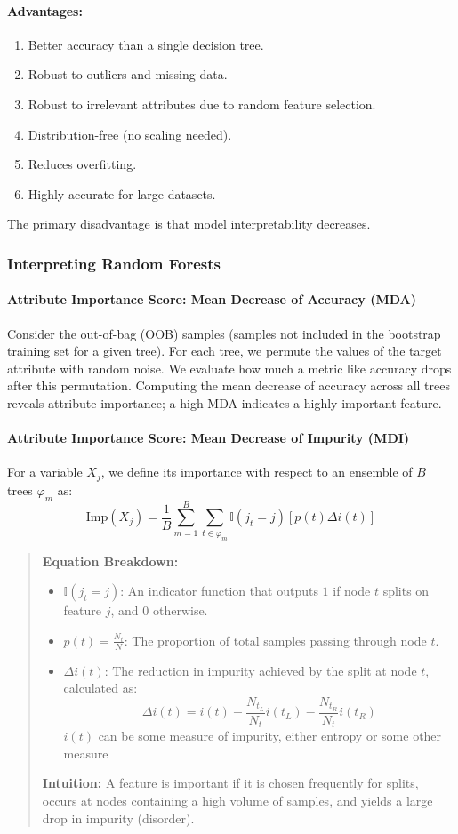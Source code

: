 \documentclass{article}
\begin{document}
\paragraph{Advantages:}
\begin{enumerate}
  \item Better accuracy than a single decision tree.
  \item Robust to outliers and missing data.
  \item Robust to irrelevant attributes due to random feature selection.
  \item Distribution-free (no scaling needed).
  \item Reduces overfitting.
  \item Highly accurate for large datasets.
\end{enumerate}
The primary disadvantage is that model interpretability decreases.

\subsubsection{Interpreting Random Forests}
\paragraph{Attribute Importance Score: Mean Decrease of Accuracy (MDA)}
Consider the out-of-bag (OOB) samples (samples not included in the bootstrap training set for a given tree). For each tree, we permute the values of the target attribute with random noise. We evaluate how much a metric like accuracy drops after this permutation. Computing the mean decrease of accuracy across all trees reveals attribute importance; a high MDA indicates a highly important feature.

\paragraph{Attribute Importance Score: Mean Decrease of Impurity (MDI)}
For a variable $X_j$, we define its importance with respect to an ensemble of $B$ trees $\varphi_m$ as:
\[ \text{Imp}(X_j) = \frac{1}{B}\sum_{m=1}^B \sum_{t\in \varphi_m} \mathbb{I}(j_t = j)\left[p(t)\Delta i (t)\right] \]

\begin{quote}
\textbf{Equation Breakdown:} 
\begin{itemize}
  \item $\mathbb{I}(j_t = j)$: An indicator function that outputs $1$ if node $t$ splits on feature $j$, and $0$ otherwise.
  \item $p(t) = \frac{N_t}{N}$: The proportion of total samples passing through node $t$.
  \item $\Delta i(t)$: The reduction in impurity achieved by the split at node $t$, calculated as:
  \[ \Delta i(t) = i(t) - \frac{N_{t_L}}{N_t} i(t_L) - \frac{N_{t_R}}{N_t}i(t_R) \]
  $i(t)$ can be some measure of impurity, either entropy or some other measure
\end{itemize}
\textbf{Intuition:} A feature is important if it is chosen frequently for splits, occurs at nodes containing a high volume of samples, and yields a large drop in impurity (disorder).
\end{quote}
\end{document}
